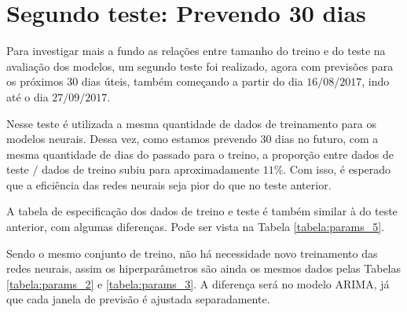\section{Segundo teste: Prevendo 30 dias}

Para investigar mais a fundo as relações entre tamanho do treino e do teste na avaliação dos modelos, um segundo teste foi realizado, agora com previsões para os próximos $30$ dias úteis, também começando a partir do dia $16/08/2017$, indo até o dia $27/09/2017$. 

Nesse teste é utilizada a mesma quantidade de dados de treinamento para os modelos neurais. Dessa vez, como estamos prevendo $30$ dias no futuro, com a mesma quantidade de dias do passado para o treino, a proporção entre dados de teste $/$ dados de treino subiu para aproximadamente $11\%$. Com isso, é esperado que a eficiência das redes neurais seja pior do que no teste anterior.

A tabela de especificação dos dados de treino e teste é também similar à do teste anterior, com algumas diferenças. Pode ser vista na Tabela \ref{tabela:params_5}.

\begin{table}[]
\begin{center}
\caption{Especificação dos dados de treino e de teste ($30$ dias).}\label{tabela:params_5}
\end{center}
\end{table}

Sendo o mesmo conjunto de treino, não há necessidade novo treinamento das redes neurais, assim os hiperparâmetros são ainda os mesmos dados pelas Tabelas \ref{tabela:params_2} e \ref{tabela:params_3}. A diferença será no modelo ARIMA, já que cada janela de previsão é ajustada separadamente.

